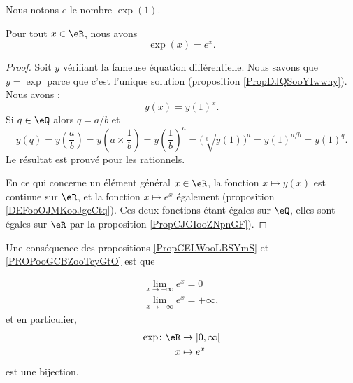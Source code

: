 \begin{definition}
    Nous notons \( e\) le nombre \( \exp(1)\).
\end{definition}

\begin{proposition}     \label{PropCELWooLBSYmS}
    Pour tout \( x\in \eR\), nous avons
    \begin{equation}        \label{EQooBFIHooKopcmf}
        \exp(x)=e^x.
    \end{equation}
\end{proposition}

\begin{proof}
    Soit \( y\) vérifiant la fameuse équation différentielle. Nous savons que \( y=\exp\) parce que c'est l'unique solution (proposition \ref{PropDJQSooYIwwhy}). Nous avons :
    \begin{equation}
        y(x)=y(1)^x.
    \end{equation}
    Si \( q\in \eQ\) alors \( q=a/b\) et
    \begin{equation}
        y(q)=y\left( \frac{ a }{ b } \right)=y\left( a\times \frac{1}{ b } \right)=y\left( \frac{1}{ b } \right)^a=\big( \sqrt[b]{y(1)} \big)^a=y(1)^{a/b}=y(1)^{q}.
    \end{equation}
    Le résultat est prouvé pour les rationnels.

    En ce qui concerne un élément général \( x\in \eR\), la fonction \( x\mapsto y(x)\) est continue sur \( \eR\), et la fonction \( x\mapsto e^x\) également (proposition \ref{DEFooOJMKooJgcCtq}). Ces deux fonctions étant égales sur \( \eQ\), elles sont égales sur \( \eR\) par la proposition  \ref{PropCJGIooZNpnGF}).
\end{proof}

Une conséquence des propositions \ref{PropCELWooLBSYmS} et \ref{PROPooGCBZooTcyGtO} est que 

\begin{subequations}    \label{EqLOIUooHxnEDn}
    \begin{align}
        \lim_{x\to -\infty}  e^{x}=0\\
        \lim_{x\to +\infty}  e^{x}=+\infty,
    \end{align}
\end{subequations}
et en particulier, 
\begin{equation}
    \begin{aligned}
    \exp\colon \eR&\to \mathopen] 0 , \infty \mathclose[ \\
        x&\mapsto  e^{x} 
    \end{aligned}
\end{equation}
est une bijection.

